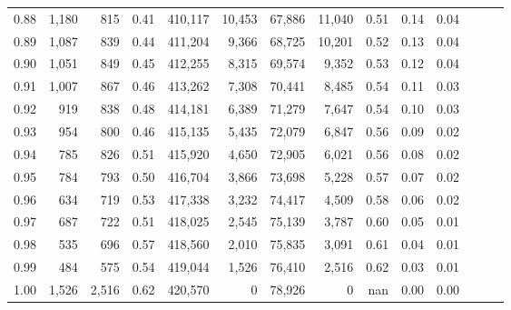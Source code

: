 \begin{tabular}{rrrrrrrrrrrrrr}
0.88 &   1,180 &    815 &  0.41 &  410,117 &   10,453 &  67,886 &  11,040 &  0.51 &  0.14 &      0.04 \\
0.89 &   1,087 &    839 &  0.44 &  411,204 &    9,366 &  68,725 &  10,201 &  0.52 &  0.13 &      0.04 \\
0.90 &   1,051 &    849 &  0.45 &  412,255 &    8,315 &  69,574 &   9,352 &  0.53 &  0.12 &      0.04 \\
0.91 &   1,007 &    867 &  0.46 &  413,262 &    7,308 &  70,441 &   8,485 &  0.54 &  0.11 &      0.03 \\
0.92 &     919 &    838 &  0.48 &  414,181 &    6,389 &  71,279 &   7,647 &  0.54 &  0.10 &      0.03 \\
0.93 &     954 &    800 &  0.46 &  415,135 &    5,435 &  72,079 &   6,847 &  0.56 &  0.09 &      0.02 \\
0.94 &     785 &    826 &  0.51 &  415,920 &    4,650 &  72,905 &   6,021 &  0.56 &  0.08 &      0.02 \\
0.95 &     784 &    793 &  0.50 &  416,704 &    3,866 &  73,698 &   5,228 &  0.57 &  0.07 &      0.02 \\
0.96 &     634 &    719 &  0.53 &  417,338 &    3,232 &  74,417 &   4,509 &  0.58 &  0.06 &      0.02 \\
0.97 &     687 &    722 &  0.51 &  418,025 &    2,545 &  75,139 &   3,787 &  0.60 &  0.05 &      0.01 \\
0.98 &     535 &    696 &  0.57 &  418,560 &    2,010 &  75,835 &   3,091 &  0.61 &  0.04 &      0.01 \\
0.99 &     484 &    575 &  0.54 &  419,044 &    1,526 &  76,410 &   2,516 &  0.62 &  0.03 &      0.01 \\
1.00 &   1,526 &  2,516 &  0.62 &  420,570 &        0 &  78,926 &       0 &   nan &  0.00 &      0.00 \\
\bottomrule
\end{tabular}
